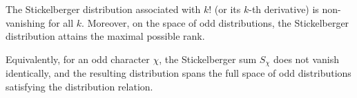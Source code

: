The Stickelberger distribution associated with $k!$ (or its $k$-th derivative) is non-vanishing for all $k$. Moreover, on the space of odd distributions, the Stickelberger distribution attains the maximal possible rank.

Equivalently, for an odd character $\chi$, the Stickelberger sum $S_\chi$ does not vanish identically, and the resulting distribution spans the full space of odd distributions satisfying the distribution relation.